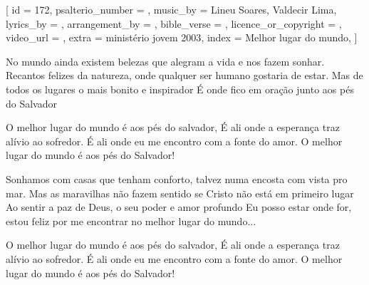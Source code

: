 
[
    id                     = {172},
    psalterio_number       = {},
    music_by               = {Lineu Soares, Valdecir Lima},
    lyrics_by              = {},
    arrangement_by         = {},
    bible_verse            = {},
    licence_or_copyright   = {},
    video_url              = {},
    extra                  = {ministério jovem 2003},
    index                  = {Melhor lugar do mundo},
]

\beginverse
No mundo ainda existem belezas que alegram a vida e nos fazem sonhar.
Recantos felizes da natureza, onde qualquer ser humano gostaria de estar.
Mas de todos os lugares o mais bonito e inspirador
É onde fico em oração junto aos pés do Salvador
\endverse

\beginchorus
O melhor lugar do mundo é aos pés do salvador,
É ali onde a esperança traz alívio ao sofredor.
É ali onde eu me encontro com a fonte do amor.
O melhor lugar do mundo é aos pés do Salvador!
\endchorus

\beginverse
Sonhamos com casas que tenham conforto, talvez numa encosta com vista pro mar.
Mas as maravilhas não fazem sentido se Cristo não está em primeiro lugar
Ao sentir a paz de Deus, o seu poder e amor profundo
Eu posso estar onde for, estou feliz por me encontrar no melhor lugar do mundo...
\endverse

\beginchorus
O melhor lugar do mundo é aos pés do salvador,
É ali onde a esperança traz alívio ao sofredor.
É ali onde eu me encontro com a fonte do amor.
O melhor lugar do mundo é aos pés do Salvador!
\endchorus


\endsong
